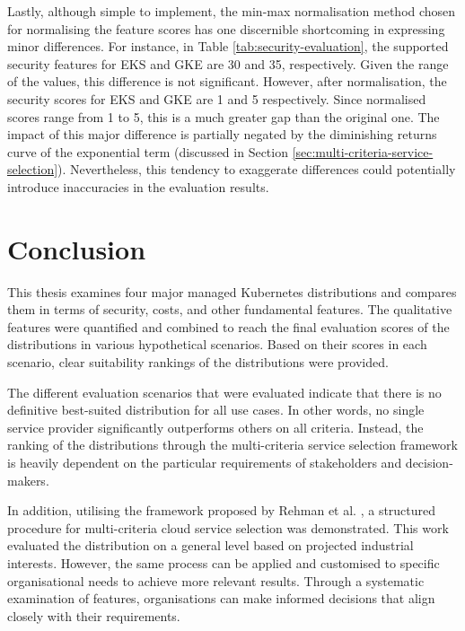 Lastly, although simple to implement, the min-max normalisation method chosen for normalising the feature scores has one discernible shortcoming in expressing minor differences. For instance, in Table \ref{tab:security-evaluation}, the supported security features for EKS and GKE are 30 and 35, respectively. Given the range of the values, this difference is not significant. However, after normalisation, the security scores for EKS and GKE are 1 and 5 respectively. Since normalised scores range from 1 to 5, this is a much greater gap than the original one. The impact of this major difference is partially negated by the diminishing returns curve of the exponential term (discussed in Section \ref{sec:multi-criteria-service-selection}). Nevertheless, this tendency to exaggerate differences could potentially introduce inaccuracies in the evaluation results.


\chapter{Conclusion}\label{conclusion}

This thesis examines four major managed Kubernetes distributions and compares them in terms of security, costs, and other fundamental features. The qualitative features were quantified and combined to reach the final evaluation scores of the distributions in various hypothetical scenarios. Based on their scores in each scenario, clear suitability rankings of the distributions were provided.

The different evaluation scenarios that were evaluated indicate that there is no definitive best-suited distribution for all use cases. In other words, no single service provider significantly outperforms others on all criteria. Instead, the ranking of the distributions through the multi-criteria service selection framework is heavily dependent on the particular requirements of stakeholders and decision-makers.

In addition, utilising the framework proposed by Rehman et al. \cite{5976164}, a structured procedure for multi-criteria cloud service selection was demonstrated. This work evaluated the distribution on a general level based on projected industrial interests. However, the same process can be applied and customised to specific organisational needs to achieve more relevant results. Through a systematic examination of features, organisations can make informed decisions that align closely with their requirements.

